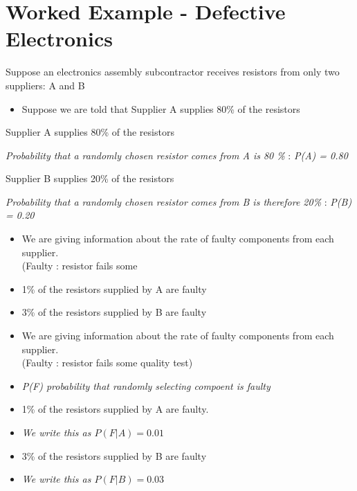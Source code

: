 \documentclass[]{report}
\begin{document}
\section*{Worked Example  - Defective Electronics}		
Suppose an electronics assembly subcontractor receives resistors from only two suppliers: A and B

\begin{itemize}
	\item Suppose we are told that Supplier A supplies 80\% of the resistors
	
	
	
\end{itemize}

\begin{framed}			
	\begin{itemize}
		\item Supplier A supplies 80\% of the resistors
		{
			
			
			\item \textit{Probability that a randomly chosen resistor comes from A is 80 \%} : \textit{P(A) = 0.80 }
			
		}
		\item Supplier B supplies 20\% of the resistors
		\item \textit{Probability that a randomly chosen resistor comes from B is therefore 20\%} : \textit{P(B) = 0.20}
	\end{itemize}
\end{framed}	



\begin{itemize}
	\item We are giving information about the rate of faulty components from each supplier. \\(Faulty : resistor fails some 
	\item 1\% of the resistors supplied by A are faulty
	
	\item 3\% of the resistors supplied by B are faulty 
	\vspace{1cm}
\end{itemize}

\begin{itemize}
	\item We are giving information about the rate of faulty components from each supplier. \\(Faulty : resistor fails some quality test)
	\item  \textit{P(F) probability that randomly selecting compoent is faulty}
	\item 1\% of the resistors supplied by A are faulty.
	\item\textit{ We write this as $P(F|A) =0.01$}
	\item 3\% of the resistors supplied by B are faulty 
	\item \textit{We write this as $P(F|B) =0.03$}
\end{itemize}
\end{document}
